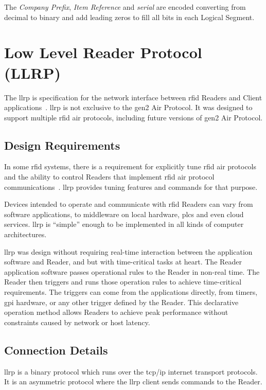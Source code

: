 The \emph{Company Prefix}, \emph{Item Reference} and \emph{serial} are encoded converting from decimal to binary and add leading zeros to fill all bits in each Logical Segment.

\section{Low Level Reader Protocol (LLRP)} \label{sec:llrp}

The \acf{llrp} is specification for the network interface between \ac{rfid} Readers and Client applications~\cite{ImpinjLTKProgrammers}. \ac{llrp} is not exclusive to the \ac{gen2} Air Protocol. It was designed to support multiple \ac{rfid} air protocols, including future versions of \ac{gen2} Air Protocol.

\subsection{Design Requirements}

In some \ac{rfid} systems, there is a requirement for explicitly tune \ac{rfid} air protocols and the ability to control Readers that implement \ac{rfid} air protocol communications~\cite{LowLevelReader}. \ac{llrp} provides tuning features and commands for that purpose.

Devices intended to operate and communicate with \ac{rfid} Readers can vary from software applications, to middleware on local hardware, \acp{plc} and even cloud services. \ac{llrp} is ``simple'' enough to be implemented in all kinds of computer architectures.

\ac{llrp} was design without requiring real-time interaction between the application software and Reader, and but with time-critical tasks at heart. 
The Reader application software passes operational rules to the Reader in non-real time.
The Reader then triggers and runs those operation rules to achieve time-critical requirements. 
The triggers can come from the applications directly, from timers, \ac{gpi} hardware, or any other trigger defined by the Reader. 
This declarative operation method allows Readers to achieve peak performance without constraints caused by network or host latency.

\subsection{Connection Details}

\ac{llrp} is a binary protocol which runs over the \acs{tcp}/\acs{ip} internet transport protocols.
It is an asymmetric protocol where the \ac{llrp} client sends commands to the Reader.

